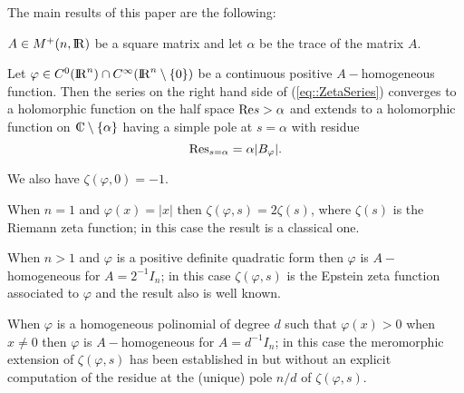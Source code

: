 \documentclass[12pt,a4paper]{amsart}
\begin{document}
The main results of this paper are the following:

\begin{theorem}\label{thm::Zetadef}
${A}\in{{{M}^+}({n},{{\rm I\kern-.185em R}})}$ be a square matrix
and let ${\alpha}$ be the trace of the matrix ${A}$.

Let ${\varphi}\in C^0({{\rm I\kern-.185em R}}^{n})\cap C^{\infty}({{\rm I\kern-.185em R}}^{n}\setminus\{0\})$
be a continuous positive ${A}-$homogeneous function.
Then the series on the right hand side of (\ref{eq::ZetaSeries})
converges to a holomorphic function on the half space
${\mathop{\rm Re}\nolimits}{s}>{\alpha}$ and extends to a holomorphic function
on ${{\rm\kern.37em\vrule height1.4ex width.05em depth-.011em\kern-.37em C}}\setminus\{{\alpha}\}$ having a simple pole at
${s}={\alpha}$ with residue
\begin{equation}\nonumber
	{\mathop{\rm Res}\limits}_{{s}={\alpha}}={\alpha}|{B}_{\varphi}|.
\end{equation}

We also have ${\zeta}({\varphi},0)=-1$.
\end{theorem}

When ${n}=1$ and ${\varphi}(x)=|x|$ then
${\zeta}({\varphi},{s})=2\zeta({s})$,
where $\zeta({s})$ is the Riemann zeta function;
in this case the result is a classical one.

When ${n}>1$ and ${\varphi}$ is a positive definite quadratic form then
${\varphi}$ is ${A}-$homogeneous
for ${A}=2^{-1}I_{n}$;
in this case ${\zeta}({\varphi},{s})$
is the Epstein zeta function associated to ${\varphi}$
and the result also is well known.

When ${\varphi}$ is a homogeneous polinomial of degree $d$
such that ${\varphi}({x})>0$ when ${x}\neq0$
then
${\varphi}$ is ${A}-$homogeneous
for ${A}=d^{-1}I_{n}$;
in this case
the meromorphic extension of ${\zeta}({\varphi},{s})$ 
has been established in
\cite{article:ChungMinAnBase}
but without an explicit computation of the residue
at the (unique) pole ${n}/d$ of ${\zeta}({\varphi},{s})$.
\end{document}
